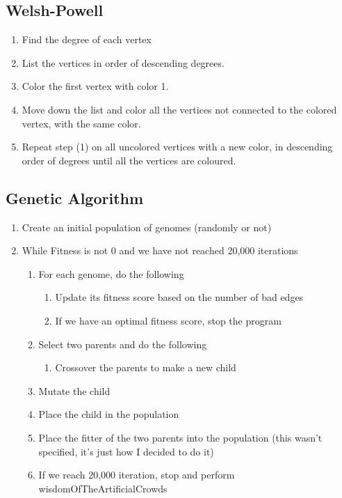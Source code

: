 \documentclass[12]{article}
\begin{document}
\subsection{Welsh-Powell}

\begin{enumerate}
\item Find the degree of each vertex
\item List the vertices in order of descending degrees.
\item Color the first vertex with color 1.
\item Move down the list and color all the vertices not connected to the colored vertex, with the same color.
\item Repeat step (1) on all uncolored vertices with a new color, in descending order of degrees until all the vertices are coloured.
\end{enumerate}

\subsection{Genetic Algorithm}
\begin{enumerate}
\item Create an initial population of genomes (randomly or not)
\item While Fitness is not 0 and we have not reached 20,000 iterations
\begin{enumerate}
	\item For each genome, do the following
	\begin{enumerate}
		\item Update its fitness score based on the number of bad edges
		\item If we have an optimal fitness score, stop the program
	\end{enumerate}
	\item Select two parents and do the following
	\begin{enumerate}
		\item Crossover the parents to make a new child
	\end{enumerate}
	\item Mutate the child
	\item Place the child in the population
	\item Place the fitter of the two parents into the population (this wasn’t specified, it’s just how I decided to do it)
\item If we reach 20,000 iteration, stop and perform wisdomOfTheArtificialCrowds
\end{enumerate}
\end{enumerate}
\end{document}
